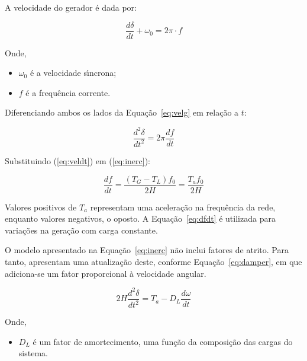 A velocidade do gerador {\'e} dada por:

\begin{equation}
	\label{eq:velg}
	\frac{d \delta}{dt} + \omega_{0} = 2 \pi \cdot f
\end{equation}

Onde,

\begin{itemize}
	\item[] $\omega_{0}$ {\'e} a velocidade s{\'\i}ncrona;
	\item[] $f$ {\'e} a frequ{\^e}ncia corrente.
\end{itemize}

Diferenciando ambos os lados da Equa{\c c}{\~a}o~\ref{eq:velg} em rela{\c c}{\~a}o a $t$:

\begin{equation}
	\label{eq:veldt}
	\frac{d^{2}\delta}{dt^{2}} = 2 \pi \frac{df}{dt}
\end{equation}

Substituindo (\ref{eq:veldt}) em (\ref{eq:inerc}):

\begin{equation}
	\label{eq:dfdt}
	\frac{df}{dt} = \frac{\left(T_{G}-T_{L}\right)f_{0}}{2H} = \frac{T_{a}f_{0}}{2H}
\end{equation}

Valores positivos de $T_{a}$ representam uma acelera{\c c}{\~a}o na frequ{\^e}ncia da rede, enquanto valores negativos, o oposto. A Equa{\c c}{\~a}o~\ref{eq:dfdt} {\'e} utilizada para varia{\c c}{\~o}es na gera{\c c}{\~a}o com carga constante.

O modelo apresentado na Equa{\c c}{\~a}o~\ref{eq:inerc} n{\~a}o inclui fatores de atrito. Para tanto,  \cite{kundur1994power} apresentam uma atualiza{\c c}{\~a}o deste, conforme Equa{\c c}{\~a}o~\ref{eq:damper}, em que adiciona-se um fator proporcional {\`a} velocidade angular.

\begin{equation}
	\label{eq:damper}
	{2H}\frac{d^{2}\delta}{dt^{2}} = T_{a} - D_{L}\frac{d\omega}{dt}
\end{equation}

Onde,

\begin{itemize}
	\item[] $D_{L}$ {\'e} um fator de amortecimento, uma fun{\c c}{\~a}o da composi{\c c}{\~a}o das cargas do sistema.
\end{itemize}

